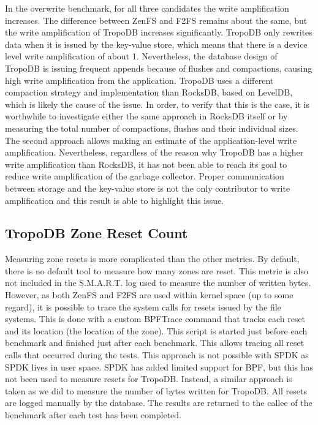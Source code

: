 In the overwrite benchmark, for all three candidates the write amplification increases. The difference between ZenFS and F2FS remains about the same, but the write amplification of TropoDB increases significantly. TropoDB only rewrites data when it is issued by the key-value store, which means that there is a device level write amplification of about 1. Nevertheless, the database design of TropoDB is issuing frequent appends because of flushes and compactions, causing high write amplification from the application. TropoDB uses a different compaction strategy and implementation than RocksDB, based on LevelDB, which is likely the cause of the issue. In order, to verify that this is the case, it is worthwhile to investigate either the same approach in RocksDB itself or by measuring the total number of compactions, flushes and their individual sizes. The second approach allows making an estimate of the application-level write amplification. Nevertheless, regardless of the reason why TropoDB has a higher write amplification than RocksDB, it has not been able to reach its goal to reduce write amplification of the garbage collector. Proper communication between storage and the key-value store is not the only contributor to write amplification and this result is able to highlight this issue. 



\subsection{TropoDB Zone Reset Count}
Measuring zone resets is more complicated than the other metrics. By default, there is no default tool to measure how many zones are reset. This metric is also not included in the S.M.A.R.T. log used to measure the number of written bytes. However, as both ZenFS and F2FS are used within kernel space (up to some regard), it is possible to trace the system calls for resets issued by the file systems. This is done with a custom BPFTrace command that tracks each reset and its location (the location of the zone). This script is started just before each benchmark and finished just after each benchmark. This allows tracing all reset calls that occurred during the tests. 
This approach is not possible with SPDK as SPDK lives in user space. SPDK has added limited support for BPF, but this has not been used to measure resets for TropoDB. Instead, a similar approach is taken as we did to measure the number of bytes written for TropoDB. All resets are logged manually by the database. The results are returned to the callee of the benchmark after each test has been completed.



